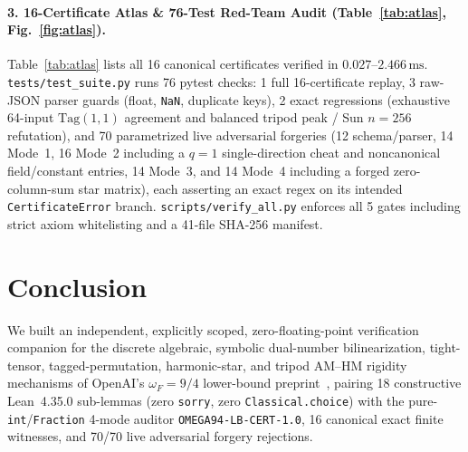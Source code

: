 \documentclass[10pt,twocolumn]{article}
\begin{document}
\paragraph{3. 16-Certificate Atlas \& 76-Test Red-Team Audit (Table~\ref{tab:atlas}, Fig.~\ref{fig:atlas}).}
Table~\ref{tab:atlas} lists all 16 canonical certificates verified in $0.027$--$2.466\,\mathrm{ms}$. \texttt{tests/test\_\allowbreak suite.py} runs 76 pytest checks: 1 full 16-certificate replay, 3 raw-JSON parser guards (float, \texttt{NaN}, duplicate keys), 2 exact regressions (exhaustive 64-input $\mathrm{Tag}(1,1)$ agreement and balanced tripod peak / Sun $n=256$ refutation), and 70 parametrized live adversarial forgeries (12 schema/parser, 14 Mode~1, 16 Mode~2 including a $q{=}1$ single-direction cheat and noncanonical field/constant entries, 14 Mode~3, and 14 Mode~4 including a forged zero-column-sum star matrix), each asserting an exact regex on its intended \texttt{CertificateError} branch. \texttt{scripts/verify\_\allowbreak all.py} enforces all 5 gates including strict axiom whitelisting and a 41-file SHA-256 manifest.

\section{Conclusion}\label{sec:conc}
We built an independent, explicitly scoped, zero-floating-point verification companion for the discrete algebraic, symbolic dual-number bilinearization, tight-tensor, tagged-permutation, harmonic-star, and tripod AM--HM rigidity mechanisms of OpenAI's $\omega_F=9/4$ lower-bound preprint~\cite{openai2026omega94}, pairing 18 constructive Lean~4.35.0 sub-lemmas (zero \texttt{sorry}, zero \texttt{Classical.choice}) with the pure-\texttt{int}/\texttt{Fraction} 4-mode auditor \texttt{OMEGA94-\allowbreak LB-\allowbreak CERT-1.0}, 16 canonical exact finite witnesses, and 70/70 live adversarial forgery rejections.

{\footnotesize

}
\end{document}
